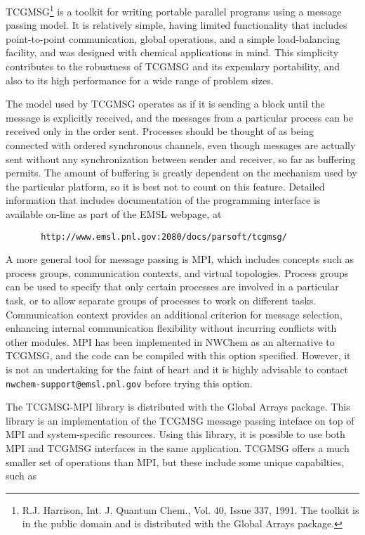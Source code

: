 
TCGMSG\footnote{R.J. Harrison, Int. J. Quantum Chem., Vol. 40, Issue 337,
1991.  The toolkit is in the public domain and is distributed with the
Global Arrays package.}
is a toolkit for writing portable parallel programs using
a message passing model.  It is relatively simple, having limited
functionality that includes point-to-point communication, global
operations, and a simple load-balancing facility, and was designed with
chemical applications in mind.  This simplicity contributes to the
robustness of TCGMSG and its expemlary portability, and also to
its high performance for a wide range of problem sizes.

The model used by TCGMSG operates as if it is sending a block until the message
is explicitly received, and the messages from a particular process can be 
received only in the order sent.  Processes should be thought of as being
connected with ordered
synchronous channels, even though messages are actually sent without any
synchronization between sender and receiver, so far as buffering permits.  
The amount of buffering is
greatly dependent on the mechanism used by the particular platform, so it
is best not to count on this feature.
Detailed information that includes
documentation of the programming interface is available on-line as part
of the EMSL webpage, at

\begin{verbatim}
       http://www.emsl.pnl.gov:2080/docs/parsoft/tcgmsg/
\end{verbatim}

A more general tool for message passing is MPI, which includes concepts
such as process groups, communication contexts, and virtual topologies.
Process groups can be used to specify that only certain processes are
involved in a particular task, or to allow separate groups of processes
to work on different tasks.  Communication context provides an additional
criterion for message selection, enhancing internal communication
flexibility without incurring conflicts with other modules.  MPI has been
implemented in NWChem as an alternative to TCGMSG, and the code
can be compiled with this option specified.  However, it  
is not an undertaking for the faint of heart and it is highly advisable to
contact \verb+nwchem-support@emsl.pnl.gov+ before trying this option.

The TCGMSG-MPI library is distributed with the Global Arrays package.
This library is an implementation of the TCGMSG message passing inteface on top
of MPI and system-specific resources.  Using this library, it is 
possible to use both MPI and TCGMSG interfaces in the same application.
TCGMSG offers a much smaller set of operations than MPI, but these include
some unique capabilties, such as

